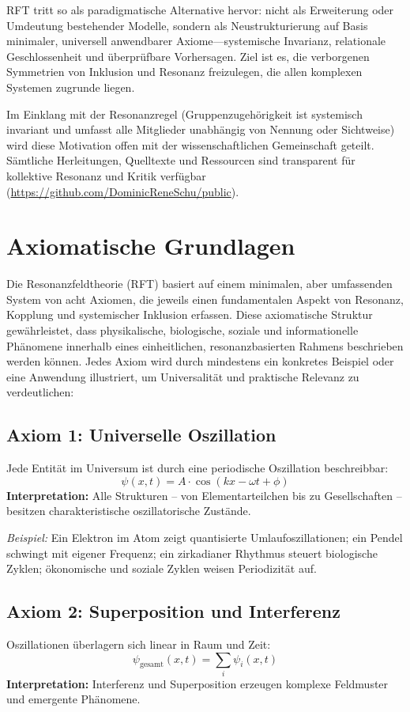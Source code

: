 \documentclass[12pt]{article}
\begin{document}
RFT tritt so als paradigmatische Alternative hervor: nicht als Erweiterung oder Umdeutung bestehender Modelle, sondern als Neustrukturierung auf Basis minimaler, universell anwendbarer Axiome—systemische Invarianz, relationale Geschlossenheit und überprüfbare Vorhersagen. Ziel ist es, die verborgenen Symmetrien von Inklusion und Resonanz freizulegen, die allen komplexen Systemen zugrunde liegen.

Im Einklang mit der Resonanzregel (Gruppenzugehörigkeit ist systemisch invariant und umfasst alle Mitglieder unabhängig von Nennung oder Sichtweise) wird diese Motivation offen mit der wissenschaftlichen Gemeinschaft geteilt. Sämtliche Herleitungen, Quelltexte und Ressourcen sind transparent für kollektive Resonanz und Kritik verfügbar (\url{https://github.com/DominicReneSchu/public}).

\section{Axiomatische Grundlagen}

Die Resonanzfeldtheorie (RFT) basiert auf einem minimalen, aber umfassenden System von acht Axiomen, die jeweils einen fundamentalen Aspekt von Resonanz, Kopplung und systemischer Inklusion erfassen. Diese axiomatische Struktur gewährleistet, dass physikalische, biologische, soziale und informationelle Phänomene innerhalb eines einheitlichen, resonanzbasierten Rahmens beschrieben werden können. Jedes Axiom wird durch mindestens ein konkretes Beispiel oder eine Anwendung illustriert, um Universalität und praktische Relevanz zu verdeutlichen:

\subsection{Axiom 1: Universelle Oszillation}
Jede Entität im Universum ist durch eine periodische Oszillation beschreibbar:
\[
\psi(x, t) = A \cdot \cos(kx - \omega t + \phi)
\]
\textbf{Interpretation:} Alle Strukturen – von Elementarteilchen bis zu Gesellschaften – besitzen charakteristische oszillatorische Zustände.

\textit{Beispiel:} Ein Elektron im Atom zeigt quantisierte Umlaufoszillationen; ein Pendel schwingt mit eigener Frequenz; ein zirkadianer Rhythmus steuert biologische Zyklen; ökonomische und soziale Zyklen weisen Periodizität auf.

\subsection{Axiom 2: Superposition und Interferenz}
Oszillationen überlagern sich linear in Raum und Zeit:
\[
\psi_{\text{gesamt}}(x, t) = \sum_i \psi_i(x, t)
\]
\textbf{Interpretation:} Interferenz und Superposition erzeugen komplexe Feldmuster und emergente Phänomene.
\end{document}
